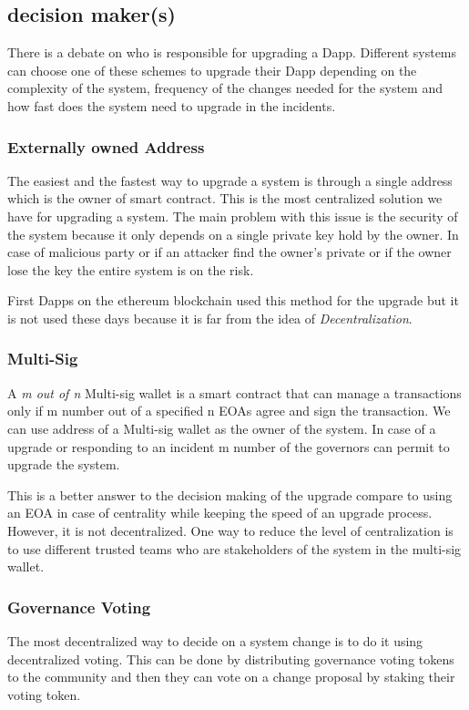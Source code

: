  \subsection{decision maker(s)} \label{decisionMakers}
 There is a debate on who is responsible for upgrading a Dapp. Different systems can choose one of these schemes to upgrade their Dapp depending on the complexity of the system, frequency of the changes needed for the system and how fast does the system need to upgrade in the incidents.
 \subsubsection{Externally owned Address}
The easiest and the fastest way to upgrade a system is through a single address which is the owner of smart contract. This is the most centralized solution we have for upgrading a system. The main problem with this issue is the security of the system because it only depends on a single private key hold by the owner. In case of malicious party or if an attacker find the owner's private or if the owner lose the key the entire system is on the risk.

First Dapps on the ethereum blockchain used this method for the upgrade but it is not used these days because it is far from the idea of \textit{Decentralization}. 

 \subsubsection{Multi-Sig}
 A \textit{m out of n} Multi-sig wallet is a smart contract that can manage a transactions only if m number out of a specified n EOAs agree and sign the transaction. We can use address of a Multi-sig wallet as the owner of the system. In case of a upgrade or responding to an incident m number of the governors can permit to upgrade the system.

 This is a better answer to the decision making of the upgrade compare to using an EOA in case of centrality while keeping the speed of an upgrade process. However, it is not decentralized. One way to reduce the level of centralization is to use different trusted teams who are stakeholders of the system in the multi-sig wallet. 


\subsubsection{Governance Voting}
The most decentralized way to decide on a system change is to do it using decentralized voting. This can be done by distributing governance voting tokens to the community and then they can vote on a change proposal by staking their voting token. 

